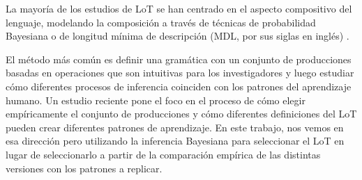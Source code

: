 La mayoría de los estudios de LoT se han centrado en el aspecto compositivo del lenguaje, modelando la composición a través de técnicas de probabilidad Bayesiana \cite{tenenbaum2011grow} o de longitud mínima de descripción (MDL, por sus siglas en inglés) \cite{amalric2017language,goldsmith2002probabilistic,romano2013language,goldsmith2001unsupervised}.



El método más común es definir una gramática con un conjunto de producciones basadas en operaciones que son intuitivas para los investigadores y luego estudiar cómo diferentes procesos de inferencia coinciden con los patrones del aprendizaje humano. Un estudio reciente \cite{piantadosi2016logical} pone el foco en el proceso de cómo elegir empíricamente el conjunto de producciones y cómo diferentes definiciones del LoT pueden crear diferentes patrones de aprendizaje. En este trabajo, nos vemos en esa dirección pero utilizando la inferencia Bayesiana para seleccionar el LoT en lugar de seleccionarlo a partir de la comparación empírica de las distintas versiones con los patrones a replicar.


